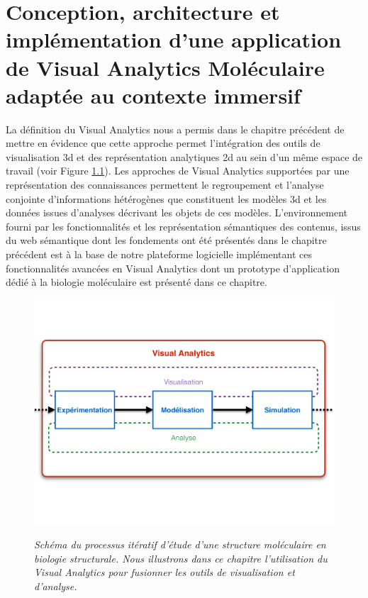 
\chapter[Conception, architecture et implémentation d'une application de Visual Analytics Moléculaire adaptée au contexte immersif]{Conception, architecture et implémentation d'une application de Visual Analytics Moléculaire adaptée au contexte immersif}
\label{Sec:visuAna}
\minitoc
\cleardoublepage

La définition du Visual Analytics nous a permis dans le chapitre précédent de mettre en évidence que cette approche permet l'intégration des outils de visualisation 3d et des représentation analytiques 2d au sein d'un même espace de travail (voir Figure \ref{Fig:process_bio_struct_VA}). Les approches de Visual Analytics supportées par une représentation des connaissances permettent le regroupement et l'analyse conjointe d'informations hétérogènes que constituent les modèles 3d et les données issues d'analyses décrivant les objets de ces modèles. L'environnement fourni par les fonctionnalités et les représentation sémantiques des contenus, issus du web sémantique dont les fondements ont été présentés dans le chapitre précédent est à la base de notre plateforme logicielle implémentant ces fonctionnalités avancées en Visual Analytics dont un prototype d'application dédié à la biologie moléculaire est présenté dans ce chapitre.

\begin{figure}
  \centering
  {\includegraphics[width=1.0\linewidth]{./figures/ch5/process_bio_struct_VA}}
    \caption[Schéma du processus itératif d'étude d'une structure moléculaire en biologie structurale.]{\it Schéma du processus itératif d'étude d'une structure moléculaire en biologie structurale. Nous illustrons dans ce chapitre l'utilisation du Visual Analytics pour fusionner les outils de visualisation et d'analyse.}
  \label{Fig:process_bio_struct_VA}
  \hspace{0.3cm}
\end{figure}


